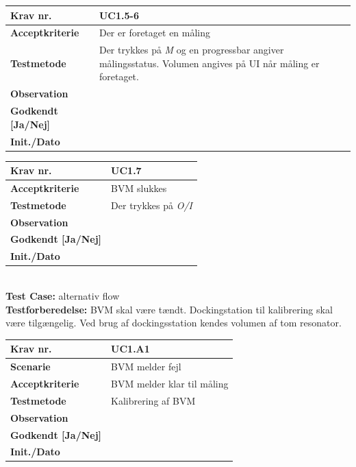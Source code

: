 			

\begin{tabularx}{1\textwidth}{|l|X|}
\hline
\textbf{Krav nr.}              & UC1.5-6  \\ \hline
\textbf{Acceptkriterie}        & Der er foretaget en måling\\ \hline
\textbf{Testmetode}            & Der trykkes på \textit{M} og en progressbar angiver målingsstatus. Volumen angives på UI når måling er foretaget. \\ \hline
\textbf{Observation}           &  \\ \hline
\textbf{Godkendt {[}Ja/Nej{]}} &  \\ \hline
\textbf{Init./Dato}            &  \\ \hline
\end{tabularx}


\begin{tabularx}{1\textwidth}{|l|X|}
\hline
\textbf{Krav nr.}              & UC1.7  \\ \hline
\textbf{Acceptkriterie}        & BVM slukkes\\ \hline
\textbf{Testmetode}            & Der trykkes på \textit{O/I} \\ \hline
\textbf{Observation}           &  \\ \hline
\textbf{Godkendt {[}Ja/Nej{]}} &  \\ \hline
\textbf{Init./Dato}            &  \\ \hline
\end{tabularx}\\
	
		
\pagebreak
\textbf{Test Case:} alternativ flow\\
\textbf{Testforberedelse:} BVM skal være tændt. Dockingstation til kalibrering skal være tilgængelig. Ved brug af dockingsstation kendes volumen af tom resonator. \\


\begin{tabularx}{1\textwidth}{|l|X|}
\hline
\textbf{Krav nr.}              & UC1.A1  \\ 
\hline
\textbf{Scenarie}              & BVM melder fejl  \\ \hline
\textbf{Acceptkriterie}        & BVM melder klar til måling\\ \hline
\textbf{Testmetode}            & Kalibrering af BVM \\ \hline
\textbf{Observation}           &  \\ \hline
\textbf{Godkendt {[}Ja/Nej{]}} &  \\ \hline
\textbf{Init./Dato}            &  \\ \hline
\end{tabularx}




